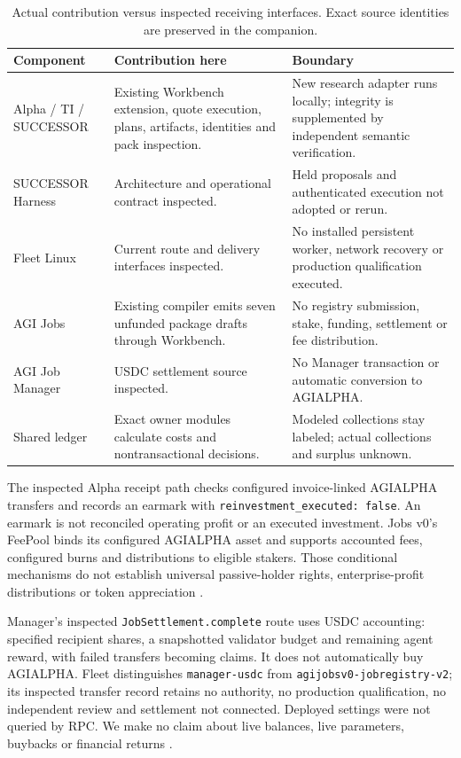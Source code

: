 \documentclass[11pt,letterpaper]{article}
\newcommand{\code}[1]{\texttt{\small #1}}
\begin{document}
\begin{table}[htbp]
\small
\caption{Actual contribution versus inspected receiving interfaces. Exact source identities are preserved in the companion.}
\begin{tabularx}{\textwidth}{@{}P{.19\textwidth}YY@{}}\toprule
Component & Contribution here & Boundary\\\midrule
Alpha / TI / SUCCESSOR & Existing Workbench extension, quote execution, plans, artifacts, identities and pack inspection. & New research adapter runs locally; integrity is supplemented by independent semantic verification.\\[4pt]
SUCCESSOR Harness & Architecture and operational contract inspected. & Held proposals and authenticated execution not adopted or rerun.\\[4pt]
Fleet Linux & Current route and delivery interfaces inspected. & No installed persistent worker, network recovery or production qualification executed.\\[4pt]
AGI Jobs & Existing compiler emits seven unfunded package drafts through Workbench. & No registry submission, stake, funding, settlement or fee distribution.\\[4pt]
AGI Job Manager & USDC settlement source inspected. & No Manager transaction or automatic conversion to AGIALPHA.\\[4pt]
Shared ledger & Exact owner modules calculate costs and nontransactional decisions. & Modeled collections stay labeled; actual collections and surplus unknown.\\\bottomrule
\end{tabularx}
\end{table}

The inspected Alpha receipt path checks configured invoice-linked AGIALPHA transfers and records an earmark with \code{reinvestment\_executed: false}. An earmark is not reconciled operating profit or an executed investment. Jobs v0's FeePool binds its configured AGIALPHA asset and supports accounted fees, configured burns and distributions to eligible stakers. Those conditional mechanisms do not establish universal passive-holder rights, enterprise-profit distributions or token appreciation \cite{tokenroutes}.

Manager's inspected \code{JobSettlement.complete} route uses USDC accounting: specified recipient shares, a snapshotted validator budget and remaining agent reward, with failed transfers becoming claims. It does not automatically buy AGIALPHA. Fleet distinguishes \code{manager-usdc} from \code{agijobsv0-jobregistry-v2}; its inspected transfer record retains no authority, no production qualification, no independent review and settlement not connected. Deployed settings were not queried by RPC. We make no claim about live balances, live parameters, buybacks or financial returns \cite{manager,fleet,tokenroutes}.
\end{document}
